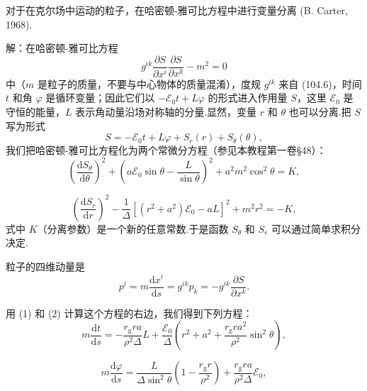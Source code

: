 \begin{xiti}

\quad 对于在克尔场中运动的粒子，在哈密顿-雅可比方程中进行变量分离 (B. Carter, 1968).

解：在哈密顿-雅可比方程
\begin{equation*}
  g^{ik}\frac{\partial S}{\partial x^{i}}
  \frac{\partial S}{\partial x^{k}}-m^{2}=0
\end{equation*}
中（$m$ 是粒子的质量，不要与中心物体的质量混淆），度规 $g^{ik}$ 来自 (104.6)，时间 $t$ 和角 $\varphi$ 是循环变量；因此它们以 $-\mathcal{E}_0t+L\varphi$ 的形式进入作用量 $S$，这里 $\mathcal{E}_0$ 是守恒的能量，$L$ 表示角动量沿场对称轴的分量.显然，变量 $r$ 和 $\theta$ 也可以分离.把 $S$ 写为形式
\begin{equation}
  S=-\mathcal{E}_0t+L\varphi+S_r(r)+S_\theta(\theta),
  \tag{1}
\end{equation}
我们把哈密顿-雅可比方程化为两个常微分方程（参见本教程第一卷§48）：
\begin{equation*}
  \left(\frac{\mathrm{d}S_\theta}{\mathrm{d}\theta}\right)^{2}
  +\left(a\mathcal{E}_0\sin\theta-\frac{L}{\sin\theta}\right)^{2}
  +a^{2}m^{2}\cos^{2}\theta=K,
\end{equation*}

\begin{equation}
  \left(\frac{\mathrm{d}S_r}{\mathrm{d}r}\right)^{2}
  -\frac{1}{\varDelta}\left[(r^{2}+a^{2})\mathcal{E}_0-aL\right]^{2}
  +m^{2}r^{2}=-K,
  \tag{2}
\end{equation}
式中 $K$（分离参数）是一个新的任意常数.于是函数 $S_\theta$ 和 $S_r$ 可以通过简单求积分决定.

粒子的四维动量是
\begin{equation*}
  p^{i}=m\frac{\mathrm{d}x^{i}}{\mathrm{d}s}
  =g^{ik}p_k=-g^{ik}\frac{\partial S}{\partial x^{k}}.
\end{equation*}

用 (1) 和 (2) 计算这个方程的右边，我们得到下列方程：
\begin{equation}
  m\frac{\mathrm{d}t}{\mathrm{d}s}
  =-\frac{r_{\mathrm{g}}ra}{\rho^{2}\varDelta}L
  +\frac{\mathcal{E}_0}{\varDelta}
  \left(r^{2}+a^{2}
  +\frac{r_{\mathrm{g}}ra^{2}}{\rho^{2}}\sin^{2}\theta\right),
  \tag{3}
\end{equation}

\begin{equation}
  m\frac{\mathrm{d}\varphi}{\mathrm{d}s}
  =\frac{L}{\varDelta\sin^{2}\theta}
  \left(1-\frac{r_{\mathrm{g}}r}{\rho^{2}}\right)
  +\frac{r_{\mathrm{g}}ra}{\rho^{2}\varDelta}\mathcal{E}_0,
  \tag{4}
\end{equation}


\end{xiti}
